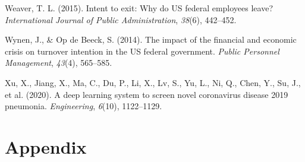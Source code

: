 \documentclass[
  man]{apa7}
\newlength{\cslhangindent}
\newlength{\cslentryspacingunit} %
\newenvironment{CSLReferences}[2] %
 {%
  \setlength{\parindent}{0pt}
  \ifodd #1
  \let\oldpar\par
  \def\par{\hangindent=\cslhangindent\oldpar}
  \fi
  \setlength{\parskip}{#2\cslentryspacingunit}
 }%
 {}
\begin{document}
\begin{CSLReferences}{1}{0}
\leavevmode{}%
Weaver, T. L. (2015). Intent to exit: Why do US federal employees leave? \emph{International Journal of Public Administration}, \emph{38}(6), 442--452.

\leavevmode{}%
Wynen, J., \& Op de Beeck, S. (2014). The impact of the financial and economic crisis on turnover intention in the US federal government. \emph{Public Personnel Management}, \emph{43}(4), 565--585.

\leavevmode{}%
Xu, X., Jiang, X., Ma, C., Du, P., Li, X., Lv, S., Yu, L., Ni, Q., Chen, Y., Su, J., et al. (2020). A deep learning system to screen novel coronavirus disease 2019 pneumonia. \emph{Engineering}, \emph{6}(10), 1122--1129.

\end{CSLReferences}

\endgroup

\newpage

\hypertarget{appendix}{%
\section{Appendix}\label{appendix}}
\end{document}
